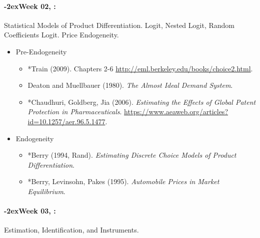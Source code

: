 \documentclass[11pt]{article}
\newcommand{\week}[1]{%
  \paragraph*{\kern-2ex\quad #1, \syldate{\today}:}%
  \AdvanceDate[7]%
}
\begin{document}
\week{Week 02} Statistical Models of Product Differentiation. Logit, Nested Logit, Random Coefficients Logit. Price Endogeneity.
\begin{itemize}
\item Pre-Endogeneity
\begin{itemize}
\item *Train (2009). Chapters 2-6 \url{http://eml.berkeley.edu/books/choice2.html}.
\item Deaton and Muellbauer (1980). \textit{The Almost Ideal Demand System}.
\item *Chaudhuri, Goldberg, Jia (2006). \textit{Estimating the Effects of Global Patent Protection in Pharmaceuticals}. \url{https://www.aeaweb.org/articles?id=10.1257/aer.96.5.1477}.
\end{itemize}
\item Endogeneity
\begin{itemize}
\item *Berry (1994, Rand). \textit{Estimating Discrete Choice Models of Product Differentiation}. 
\item *Berry, Levinsohn, Pakes (1995). \textit{Automobile Prices in Market Equilibrium}.
\end{itemize}
\end{itemize}
\week{Week 03} Estimation, Identification, and Instruments.
\end{document}
